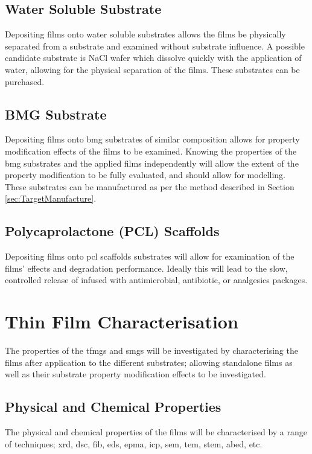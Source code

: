 \documentclass[a4paper,12pt,oneside]{report}%
\begin{document}
\subsection{Water Soluble Substrate} 
Depositing films onto water soluble substrates allows the films be physically separated from a substrate and examined without substrate influence. A possible candidate substrate is NaCl wafer which dissolve quickly with the application of water, allowing for the physical separation of the films. These substrates can be purchased. 

\subsection{BMG Substrate}
Depositing films onto \gls{bmg} substrates of similar composition allows for property modification effects of the films to be examined. Knowing the properties of the \gls{bmg} substrates and the applied films independently will allow the extent of the property modification to be fully evaluated, and should allow for modelling. These substrates can be manufactured as per the method described in Section \ref{sec:TargetManufacture}. 

\subsection{Polycaprolactone (PCL) Scaffolds}
Depositing films onto \gls{pcl} scaffolds substrates will allow for examination of the films' effects and degradation performance. Ideally this will lead to the slow, controlled release of infused with antimicrobial, antibiotic, or analgesics packages.

\section{Thin Film Characterisation}
The properties of the \glspl{tfmg} and \glspl{smg} will be investigated by characterising the films after application to the different substrates; allowing standalone films as well as their substrate property modification effects to be investigated. 

\subsection{Physical and Chemical Properties}
The physical and chemical properties of the films will be characterised by a range of techniques; \acrshort{xrd}, \acrshort{dsc}, \acrshort{fib}, \acrshort{eds}, \acrshort{epma}, \acrshort{icp}, \acrshort{sem}, \acrshort{tem}, \acrshort{stem}, \acrshort{abed}, etc. 
\end{document}
